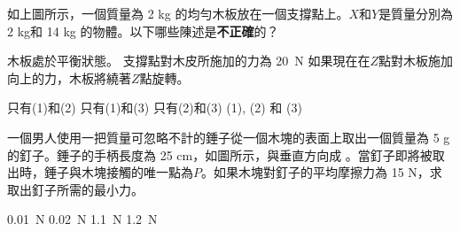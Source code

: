 {
     \par\bigskip
    如上圖所示，一個質量為 2 kg 的均勻木板放在一個支撐點上。$X$和$Y$是質量分別為 2 kg和 14 kg 的物體。以下哪些陳述是\textbf{不正確}的？
    \begin{statements}
        \task 木板處於平衡狀態。
        \task 支撐點對木皮所施加的力為 \qty{20}{N}
        \task 如果現在在$Z$點對木板施加向上的力，木板將繞著$Z$點旋轉。
    \end{statements}
    \begin{tasks}
        \task 只有(1)和(2)
        \task 只有(1)和(3)
        \task 只有(2)和(3)
        \task (1), (2) 和 (3)
    \end{tasks}
}{}

{
    \bigskip
    一個男人使用一把質量可忽略不計的錘子從一個木塊的表面上取出一個質量為 5 g 的釘子。錘子的手柄長度為 25 cm，如圖所示，與垂直方向成 。當釘子即將被取出時，錘子與木塊接觸的唯一點為$P$。如果木塊對釘子的平均摩擦力為 15 N，求取出釘子所需的最小力。
    \begin{tasks}
        \task \qty{0.01}{N}
        \task \qty{0.02}{N}
        \task \qty{1.1}{N}
        \task \qty{1.2}{N}
    \end{tasks}
}{}

